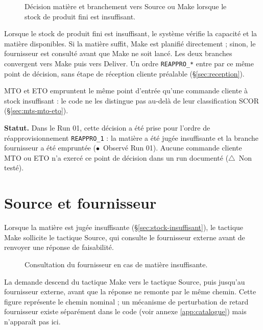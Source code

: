 \documentclass[11pt,a4paper]{article}
\newcommand{\code}[1]{\texttt{#1}}
\newcommand{\stRUN}{\ensuremath{\bullet}~Observé Run 01}
\newcommand{\stNT}{\ensuremath{\triangle}~Non testé}
\newcommand{\statut}[1]{\textbf{Statut.} #1}
\begin{document}
\begin{figure}[H]
\centering
\resizebox{0.75\textwidth}{!}{}
\caption{Décision matière et branchement vers Source ou Make lorsque le stock de produit fini est insuffisant.}
\label{fig:act0405}
\end{figure}

Lorsque le stock de produit fini est insuffisant, le système vérifie la capacité et la matière disponibles. Si la matière suffit, Make est planifié directement ; sinon, le fournisseur est consulté avant que Make ne soit lancé. Les deux branches convergent vers Make puis vers Deliver. Un ordre \code{REAPPRO\_*} entre par ce même point de décision, sans étape de réception cliente préalable (\S\ref{sec:reception}).

MTO et ETO empruntent le même point d'entrée qu'une commande cliente à stock insuffisant : le code ne les distingue pas au-delà de leur classification SCOR (\S\ref{sec:mts-mto-eto}).

\statut{Dans le Run 01, cette décision a été prise pour l'ordre de réapprovisionnement \code{REAPPRO\_1} : la matière a été jugée insuffisante et la branche fournisseur a été empruntée (\stRUN). Aucune commande cliente MTO ou ETO n'a exercé ce point de décision dans un run documenté (\stNT).}

\section{Source et fournisseur}
\label{sec:source}

Lorsque la matière est jugée insuffisante (\S\ref{sec:stock-insuffisant}), le tactique Make sollicite le tactique Source, qui consulte le fournisseur externe avant de renvoyer une réponse de faisabilité.

\begin{landscape}
\begin{figure}[p]
\centering
\resizebox{\linewidth}{!}{}
\caption{Consultation du fournisseur en cas de matière insuffisante.}
\label{fig:seq03}
\end{figure}
\end{landscape}

La demande descend du tactique Make vers le tactique Source, puis jusqu'au fournisseur externe, avant que la réponse ne remonte par le même chemin. Cette figure représente le chemin nominal ; un mécanisme de perturbation de retard fournisseur existe séparément dans le code (voir annexe \ref{app:catalogue}) mais n'apparaît pas ici.
\end{document}
